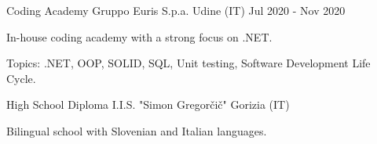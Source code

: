 

\begin{cventries}

\cventry
    {Coding Academy} %
    {Gruppo Euris S.p.a.} %
    {Udine (IT)} %
    {Jul 2020 - Nov 2020} %
    {
      \begin{cvitems} %
        \item {In-house coding academy with a strong focus on .NET.}
        \item {Topics: .NET, OOP, SOLID, SQL, Unit testing, Software Development Life Cycle.}
      \end{cvitems}
    }

\cventry
    {High School Diploma} %
    {I.I.S. "Simon Gregorčič"} %
    {Gorizia (IT)} %
    {} %
    {
      \begin{cvitems} %
        \item {Bilingual school with Slovenian and Italian languages.}
      \end{cvitems}
    }
\end{cventries}
